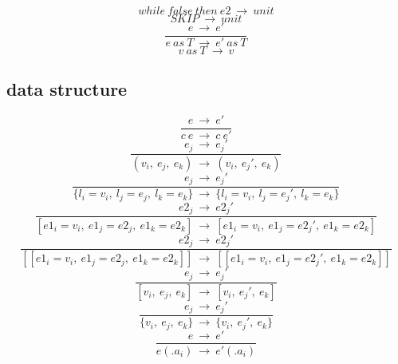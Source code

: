 \documentclass[10pt,a4paper]{article}
\begin{document}
\begin{equation}while\ false\ then\ e2\ \rightarrow \ unit\ \tag{\ E-LOOPFALSE\ }\end{equation}
\begin{equation}SKIP\ \rightarrow \ unit\ \tag{\ E-SKIP\ }\end{equation}
\begin{equation}\frac{e\ \rightarrow \ e'}{e\ as\ T\ \rightarrow \ e'\ as\ T}\ \tag{\ E-ASCR1\ }\end{equation}
\begin{equation}v\ as\ T \ \rightarrow \ v\ \tag{\ E-ASCR2\ }\end{equation}  

\subsection*{ data structure }
\begin{equation}\frac{e\ \rightarrow \ e'}{c\ e\ \rightarrow \ c\ e'}\ \tag{\ E-CONST\ }\end{equation}
\begin{equation}\frac{e_j\ \rightarrow \ e_j'}{(v_i,\ e_j,\ e_k)\ \rightarrow \ (v_i,\ e_j',\ e_k)}\ \tag{\ E-TUPLES\ }\end{equation}
\begin{equation}\frac{e_j\ \rightarrow \ e_j'}{\{l_i=v_i,\ l_j=e_j,\ l_k=e_k\}\ \rightarrow \ \{l_i=v_i,\ l_j=e_j',\ l_k=e_k\}}\ \tag{\ E-RECORDS\ }\end{equation}
\begin{equation}\frac{e2_j\ \rightarrow \ e2_j'}{[e1_i=v_i,\ e1_j=e2_j,\ e1_k=e2_k]\ \rightarrow \ [e1_i=v_i,\ e1_j=e2_j',\ e1_k=e2_k]}\ \tag{\ E-MAP\ }\end{equation}
\begin{equation}\frac{e2_j\ \rightarrow \ e2_j'}{[[e1_i=v_i,\ e1_j=e2_j,\ e1_k=e2_k]]\ \rightarrow \ [[e1_i=v_i,\ e1_j=e2_j',\ e1_k=e2_k]]}\ \tag{\ E-BIGMAP\ }\end{equation}
\begin{equation}\frac{e_j\ \rightarrow \ e_j'}{[v_i,\ e_j,\ e_k]\ \rightarrow \ [v_i,\ e_j',\ e_k]}\ \tag{\ E-LIST\ }\end{equation}
\begin{equation}\frac{e_j\ \rightarrow \ e_j'}{\{v_i,\ e_j,\ e_k\}\ \rightarrow \ \{v_i,\ e_j',\ e_k\}}\ \tag{\ E-SET\ }\end{equation}
\begin{equation}\frac{e\ \rightarrow \ e'}{e(.a_i)\ \rightarrow \ e'(.a_i)}\ \tag{\ E-ACCESS\ }\end{equation}
\end{document}
